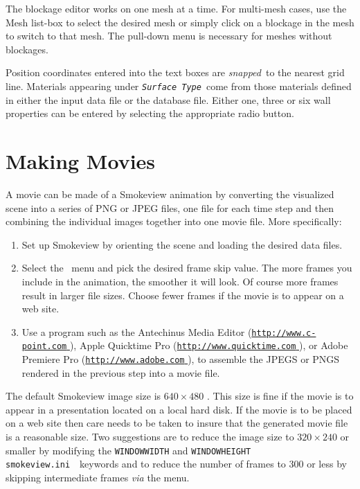 \documentclass[11pt,twoside]{book}
\newcommand{\svini}{{\tt smokeview.ini}\ }
\newcommand{\hhref}[1]{\href{#1}{{\tt #1}
}}
\newcommand{\frameit}[1]{\fbox{\tt #1}}
\begin{document}
The blockage editor works on one mesh at a time. For multi-mesh
cases, use the Mesh list-box to select the desired mesh or simply
click on a blockage in the mesh to switch to that mesh. The
pull-down menu is necessary for meshes without blockages.

Position coordinates entered into the text boxes are
{\em snapped}\ to the nearest grid line.  Materials appearing
under {\em\tt Surface Type}\ come from those materials
defined in either the input data file or the database file.
Either one, three or six wall properties can be entered by
selecting the appropriate radio button.

\chapter{Making Movies} \label{section:movie} A movie can be made
of a Smokeview animation by converting the visualized scene into a
series of PNG or JPEG files, one file for each time step and then
combining the individual images together into one movie file. More
specifically:

\begin{enumerate}
\item Set up Smokeview by orienting the scene and loading the
desired data files.

\item Select the \ menu and pick the
desired frame skip value. The more frames you include in
the animation, the smoother it will look. Of course more
frames result in larger file sizes.  Choose fewer frames
if the movie is to appear on a web site.

\item Use a program such as the Antechinus Media Editor
(\hhref{http://www.c-point.com}),
Apple Quicktime Pro (\hhref{http://www.quicktime.com}),
 or
Adobe Premiere Pro (\hhref{http://www.adobe.com}),
to assemble the
JPEGS or PNGS rendered in the previous step into a movie
file.
\end{enumerate}

The default Smokeview image size is $640\times 480$ .  This size
is fine if the movie is to appear in a presentation located on a
local hard disk.  If the movie is to be placed on a web site then
care needs to be taken to insure that the generated movie file is
a reasonable size.  Two suggestions are to reduce the image size
to $320\times 240$ or smaller by modifying the {\tt WINDOWWIDTH}
and {\tt WINDOWHEIGHT} \svini\ keywords  and to reduce the
number of frames to 300 or less by skipping intermediate frames
{\em via} the \frameit{Options/Render} menu.
\end{document}
